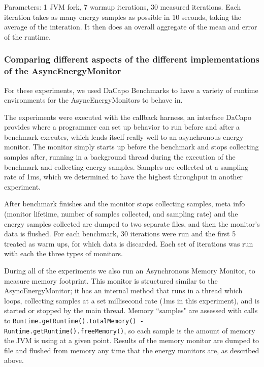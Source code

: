     Parameters: 1 JVM fork, 7 warmup iterations, 30 measured iterations. Each iteration takes as many energy samples as possible in 10 seconds, taking the average of the interation. It then does an overall aggregate of the mean and error of the runtime.

\subsubsection{Comparing different aspects of the different implementations of the AsyncEnergyMonitor}
    For these experiments, we used DaCapo Benchmarks to have a variety of runtime environments for the AsyncEnergyMonitors to behave in.

    The experiments were executed with the callback harness, an interface  DaCapo provides where a programmer can set up behavior to run before and after a benchmark executes, which lends itself really well to an asynchronous energy monitor. The monitor simply starts up before the benchmark and stops collecting samples after, running in a background thread during the execution of the benchmark and collecting energy samples. Samples are collected at a sampling rate of 1ms, which we determined to have the highest throughput in another experiment.

    After benchmark finishes and the monitor stops collecting samples, meta info (monitor lifetime, number of samples collected, and sampling rate) and the energy samples collected are dumped to two separate files, and then the monitor's data is flushed. For each benchmark, 30 iterations were run and the first 5 treated as warm ups, for which data is discarded. Each set of iterations was run with each the three types of monitors. 

    During all of the experiments we also run an Asynchronous Memory Monitor, to measure memory footprint. This monitor is structured similar to the AsyncEnergyMonitor; it has an internal method that runs in a thread which loops, collecting samples at a set millisecond rate (1ms in this experiment), and is started or stopped by the main thread. Memory ``samples" are assessed with calls to \texttt{Runtime.getRuntime().totalMemory() - Runtime.getRuntime().freeMemory()}, so each sample is the amount of memory the JVM is using at a given point. Results of the memory monitor are dumped to file and flushed from memory any time that the energy monitors are, as described above. 


